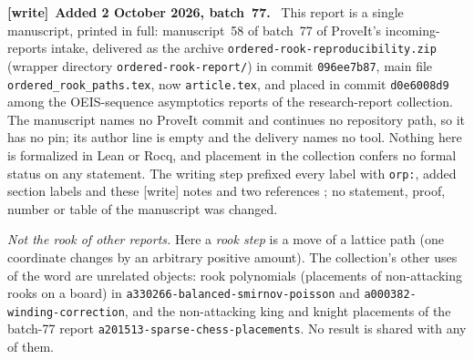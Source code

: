 \documentclass[11pt]{article}
\theoremstyle{remark}\newtheorem{remark}[theorem]{Remark}
\newenvironment{writenote}[1][]{\par\smallskip\begingroup\small
 \noindent\textbf{[write]}\if\relax\detokenize{#1}\relax\else~\textbf{#1.}\fi\ }%
 {\par\endgroup\smallskip}
\begin{document}
\begin{writenote}[Added 2 October 2026, batch~77]
This report is a single manuscript, printed in full: manuscript~58 of
batch~77 of ProveIt's incoming-reports intake, delivered as the archive
\texttt{ordered-\allowbreak rook-\allowbreak reproducibility.zip} (wrapper
directory \texttt{ordered-\allowbreak rook-\allowbreak report/}) in commit
\texttt{096ee7b87}, main file \texttt{ordered\_rook\_paths.tex}, now
\texttt{article.tex}, and placed in commit \texttt{d0e6008d9} among the
OEIS-sequence asymptotics reports of the research-report collection. The
manuscript names no ProveIt commit and continues no repository path, so it
has no pin; its author line is empty and the delivery names no tool. Nothing
here is formalized in Lean or Rocq, and placement in the collection confers
no formal status on any statement. The writing step prefixed every label
with \texttt{orp:}, added section labels and these \textsf{[write]} notes and
two references \cite{orp-tai,orp-cti}; no statement, proof, number or table
of the manuscript was changed.

\emph{Not the rook of other reports.} Here a \emph{rook step} is a move of
a lattice path (one coordinate changes by an arbitrary positive amount). The
collection's other uses of the word are unrelated objects: rook polynomials
(placements of non-attacking rooks on a board) in
\texttt{a330266-\allowbreak balanced-\allowbreak smirnov-\allowbreak poisson}
and \texttt{a000382-\allowbreak winding-\allowbreak correction}, and the
non-attacking king and knight placements of the batch-77 report
\texttt{a201513-\allowbreak sparse-\allowbreak chess-\allowbreak placements}.
No result is shared with any of them.


\end{writenote}
\end{document}
